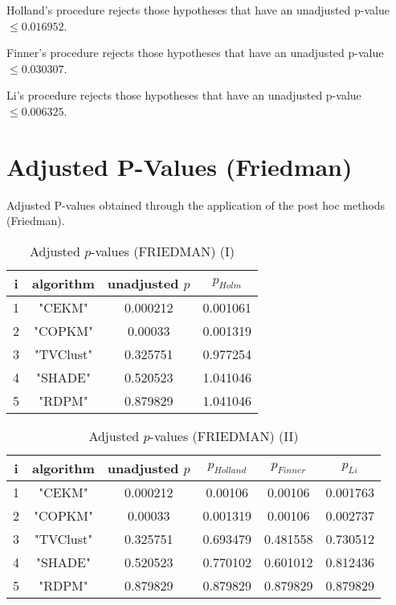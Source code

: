\documentclass[a4paper,10pt]{article}
\begin{document}
Holland's procedure rejects those hypotheses that have an unadjusted p-value $\le0.016952$.

Finner's procedure rejects those hypotheses that have an unadjusted p-value $\le0.030307$.

Li's procedure rejects those hypotheses that have an unadjusted p-value $\le0.006325$.


\newpage

\section{Adjusted P-Values (Friedman)}


Adjusted P-values obtained through the application of the post hoc methods (Friedman).

\begin{table}[!htp]
\centering\small
\begin{tabular}{cccc}
i&algorithm&unadjusted $p$&$p_{Holm}$\\
\hline1&"CEKM"&0.000212&0.001061\\2&"COPKM"&0.00033&0.001319\\3&"TVClust"&0.325751&0.977254\\4&"SHADE"&0.520523&1.041046\\5&"RDPM"&0.879829&1.041046\\\hline
\end{tabular}
\caption{Adjusted $p$-values (FRIEDMAN) (I)}
\end{table}
\begin{table}[!htp]
\centering\small
\begin{tabular}{cccccc}
i&algorithm&unadjusted $p$&$p_{Holland}$&$p_{Finner}$&$p_{Li}$\\
\hline1&"CEKM"&0.000212&0.00106&0.00106&0.001763\\2&"COPKM"&0.00033&0.001319&0.00106&0.002737\\3&"TVClust"&0.325751&0.693479&0.481558&0.730512\\4&"SHADE"&0.520523&0.770102&0.601012&0.812436\\5&"RDPM"&0.879829&0.879829&0.879829&0.879829\\\hline
\end{tabular}
\caption{Adjusted $p$-values (FRIEDMAN) (II)}
\end{table}

\newpage
\end{document}

